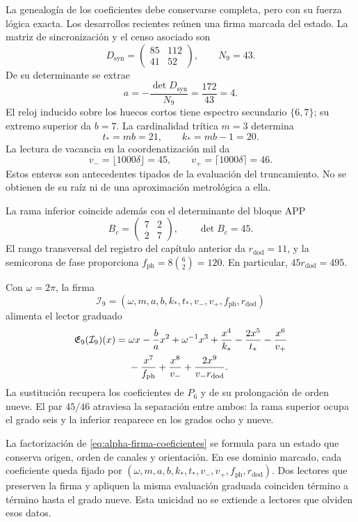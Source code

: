 La genealogía de los coeficientes debe conservarse completa, pero con su
fuerza lógica exacta. Los desarrollos recientes reúnen una firma marcada
del estado. La matriz de sincronización y el censo asociado son
\[
 D_{\mathrm{syn}}=\begin{pmatrix}85&112\\41&52\end{pmatrix},
 \qquad N_9=43.
\]
De su determinante se extrae
\[
 a=-\frac{\det D_{\mathrm{syn}}}{N_9}
   =\frac{172}{43}=4.
\]
El reloj inducido sobre los huecos cortos tiene espectro secundario
\(\{6,7\}\); su extremo superior da \(b=7\). La cardinalidad
trítica \(m=3\) determina
\[
 t_*=mb=21,\qquad k_*=mb-1=20.
\]
La lectura de vacancia en la coordenatización mil da
\[
 v_-=\lfloor1000\delta\rfloor=45,\qquad
 v_+=\lceil1000\delta\rceil=46.
\]
Estos enteros son antecedentes tipados de la evaluación del truncamiento. No se
obtienen de su raíz ni de una aproximación metrológica a ella.

La rama inferior coincide además con el determinante del bloque APP
\[
 B_c=\begin{pmatrix}7&2\\2&7\end{pmatrix},\qquad\det B_c=45.
\]
El rango transversal del registro del capítulo anterior da
\(r_{\mathrm{dod}}=11\), y la semicorona de fase proporciona
\(f_{\mathrm{ph}}=8\binom62=120\). En particular,
\(45r_{\mathrm{dod}}=495\).

Con \(\omega=2\pi\), la firma
\[
 \mathcal I_9=(\omega,m,a,b,k_*,t_*,v_-,v_+,f_{\mathrm{ph}},r_{\mathrm{dod}})
\]
alimenta el lector graduado
\begin{align}
 \mathfrak E_9(\mathcal I_9)(x)
 ={}&\omega x-\frac ba x^2+\omega^{-1}x^3
 +\frac{x^4}{k_*}-\frac{2x^5}{t_*}-\frac{x^6}{v_+}\notag\\
 &-\frac{x^7}{f_{\mathrm{ph}}}+\frac{x^8}{v_-}
 +\frac{2x^9}{v_-r_{\mathrm{dod}}}.
 \label{eq:alpha-firma-coeficientes}
\end{align}
La sustitución recupera los coeficientes de \(P_6\) y de su
prolongación de orden nueve. El par \(45/46\) atraviesa la separación
entre ambos: la rama superior ocupa el grado seis y la inferior reaparece
en los grados ocho y nueve.

La factorización de \eqref{eq:alpha-firma-coeficientes} se formula
para un estado que conserva origen, orden de canales y orientación.
En ese dominio marcado, cada coeficiente queda fijado por
\((\omega,m,a,b,k_*,t_*,v_-,v_+,f_{\mathrm{ph}},r_{\mathrm{dod}})\).
Dos lectores que preserven la firma y apliquen la misma evaluación
graduada coinciden término a término hasta el grado nueve. Esta
unicidad no se extiende a lectores que olviden esos datos.

